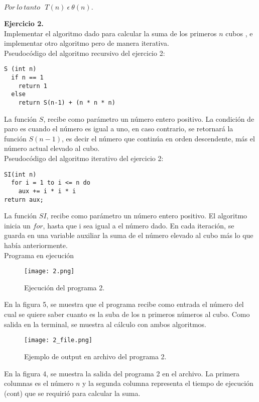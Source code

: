 \documentclass[12pt]{report}
\begin{document}
$Por \ lo \ tanto \ \ \ T(n) \ \epsilon \ \theta (n).$\newpage
	
	\textbf{Ejercicio 2.}\\
	
	Implementar el algoritmo dado para calcular la suma de los primeros $n$ cubos , e implementar otro algoritmo pero de manera iterativa.\newline \\
	Pseudocódigo del algoritmo recursivo del ejercicio 2:
	\lstset{language=C, breaklines=true, basicstyle=\footnotesize}
	\lstset{numbers=left, numberstyle=\tiny, stepnumber=1, numbersep=10pt}
	\begin{lstlisting}
S (int n)
  if n == 1
    return 1
  else
    return S(n-1) + (n * n * n)
	\end{lstlisting}
	
	La función $S$, recibe como parámetro un número entero positivo. La condición de paro es cuando el número es igual a uno, en caso contrario, se retornará la función $S(n-1)$, es decir el número que continúa en orden descendente, más el número actual elevado al cubo.\\
	
	Pseudocódigo del algoritmo iterativo del ejercicio 2:
	\lstset{language=C, breaklines=true, basicstyle=\footnotesize}
	\lstset{numbers=left, numberstyle=\tiny, stepnumber=1, numbersep=10pt}
	\begin{lstlisting}
SI(int n)
  for i = 1 to i <= n do
	aux += i * i * i
return aux;
	\end{lstlisting}
	
	La función $SI$, recibe como parámetro un número entero positivo. El algoritmo inicia un $for$, hasta que i sea igual a el número dado. En cada iteración, se guarda en una variable auxiliar la suma de el número elevado al cubo más lo que había anteriormente.\\
	
	Programa en ejecución\\
	\begin{figure}[H]
		\texttt{[image: 2.png]}
		\centering
		\caption{Ejecución del programa 2.}
		\centering
	\end{figure}
	En la figura 5, se muestra que el programa recibe como entrada el número del cual se quiere saber cuanto es la suba de los n primeros números al cubo. Como salida en la terminal, se muestra al cálculo con ambos algoritmos.
	\begin{figure}[H]
		\texttt{[image: 2\_file.png]}
		\centering
		\caption{Ejemplo de output en archivo del programa 2.}
		\centering
	\end{figure}
	En la figura 4, se muestra la salida del programa 2 en el archivo. La primera columnas es el número $n$ y la segunda columna representa el tiempo de ejecución (cont) que se requirió para calcular la suma.\\
	
\end{document}
